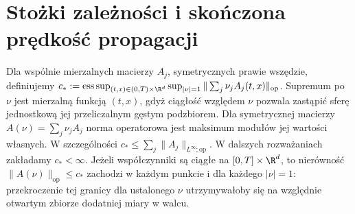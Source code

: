 \section{Stożki zależności i skończona prędkość propagacji}
\begin{definicja}
Dla wspólnie mierzalnych macierzy $A_j$,
symetrycznych prawie wszędzie, definiujemy
$c_*:=\operatorname*{ess\,sup}_{(t,x)\in(0,T)\times\R^d}
\sup_{|\nu|=1}\|\sum_j\nu_jA_j(t,x)\|_{\mathrm{op}}$.
Supremum po $\nu$ jest mierzalną funkcją $(t,x)$,
gdyż ciągłość względem $\nu$ pozwala zastąpić sferę
jednostkową jej przeliczalnym gęstym podzbiorem.
Dla symetrycznej macierzy $A(\nu)=\sum_j\nu_jA_j$
norma operatorowa jest maksimum modułów jej wartości
własnych. W szczególności
$c_*\le\sum_j\|A_j\|_{L^\infty;\mathrm{op}}$.
W dalszych rozważaniach zakładamy $c_*<\infty$.
Jeżeli współczynniki są ciągłe na $[0,T]\times\R^d$,
to nierówność $\|A(\nu)\|_{\mathrm{op}}\le c_*$
zachodzi w każdym punkcie i dla każdego $|\nu|=1$:
przekroczenie tej granicy dla ustalonego $\nu$
utrzymywałoby się na względnie otwartym zbiorze
dodatniej miary w walcu.
\end{definicja}


